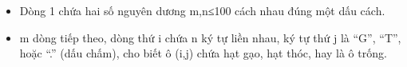 \begin{itemize}
	\item     Dòng 1 chứa hai số nguyên dương m,n≤100 cách nhau đúng một dấu cách.   
	\item     m dòng tiếp theo, dòng thứ i chứa n ký tự liền nhau, ký tự thứ j là “G”, “T”, hoặc “.” (dấu chấm), cho biết ô (i,j) chứa hạt gạo, hạt thóc, hay là ô trống.   
\end{itemize}